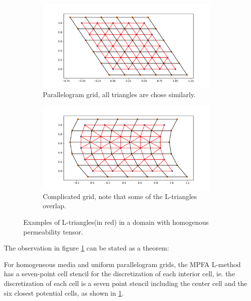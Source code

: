 \documentclass[../Main/main.tex]{subfiles}
\begin{document}
	\begin{figure}[H]
		\centering
		\begin{subfigure}[b]{0.8\textwidth}
			\centering
			\includegraphics[width=\textwidth]{L-triangles_paralellogram.pdf}
			\caption{Parallelogram grid, all triangles are chose similarly.}
			\label{fig:paralellogram-L}
		\end{subfigure}
		\hfill
		\begin{subfigure}[b]{0.8\textwidth}
			\centering
			\includegraphics[width=\textwidth]{L-triangles_complex.pdf}
			\caption{Complicated grid, note that some of the L-triangles overlap.}
			\label{fig:complicated-L}
		\end{subfigure}
		\caption{Examples of L-triangles(in red) in a domain with homogenous permeability tensor.}
		\label{fig:L-triangles}
	\end{figure}
	The observation in figure \ref{fig:paralellogram-L} can be stated as a theorem:
	\begin{theorem}
		\label{th:L_triangulation}
		For homogeneous media and uniform parallelogram grids, the MPFA L-method
		has a seven-point cell stencil for the discretization of each interior cell, ie. the discretization of each cell is a seven point stencil including the center cell and the six closest potential cells, as shown in \ref{fig:paralellogram-L}.
	\end{theorem}
\end{document}
